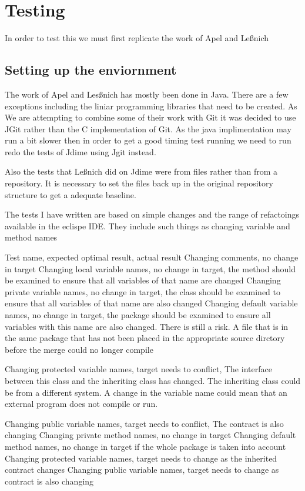 
\chapter{Testing}
In order to test this we must first replicate the work of Apel and Le{\ss}nich

\section{Setting up the enviornment}
The work of Apel and Les{\ss}nich has mostly been done in Java.  There are a few exceptions including the liniar programming libraries that need to be created.  As We are attempting to combine some of their work with Git it was decided to use JGit rather than the C implementation of Git. As the java implimentation may run a bit slower then in order to get a good timing test running we need to run redo the tests of Jdime using Jgit instead. 

Also the tests that Le{\ss}nich did on Jdime were from files rather than from a repository. It is necessary to set the files back up in the original repository structure to get a adequate baseline.

The tests I have written are based on simple changes and the range of refactoings available in the eclispe IDE.  They include such things as changing variable and method names 

Test name, expected optimal result, actual result
Changing comments, no change in target
Changing local variable names, no change in target, the method should be examined to ensure that all variables of that name are changed
Changing private variable names, no change in target,  the class should be examined to ensure that all variables of that name are also changed
Changing default variable names, no change in target, the  package should be examined to ensure all variables with this name are also changed. There is still a risk. A file that is in the same package that has not been placed in the appropriate source dirctory before the merge could no longer compile
 
Changing protected variable names, target needs to conflict, The interface between this class and the inheriting class has changed.  The inheriting class could be from a different system.  A change in the variable name could mean that an external program does not compile or run.

Changing public variable names, target needs to conflict, The contract is also changing
Changing private method names, no change in target
Changing default method names, no change in target if the whole package is taken into account
Changing protected variable names, target needs to change as the inherited contract changes
Changing public variable names, target needs to change as contract is also changing 

